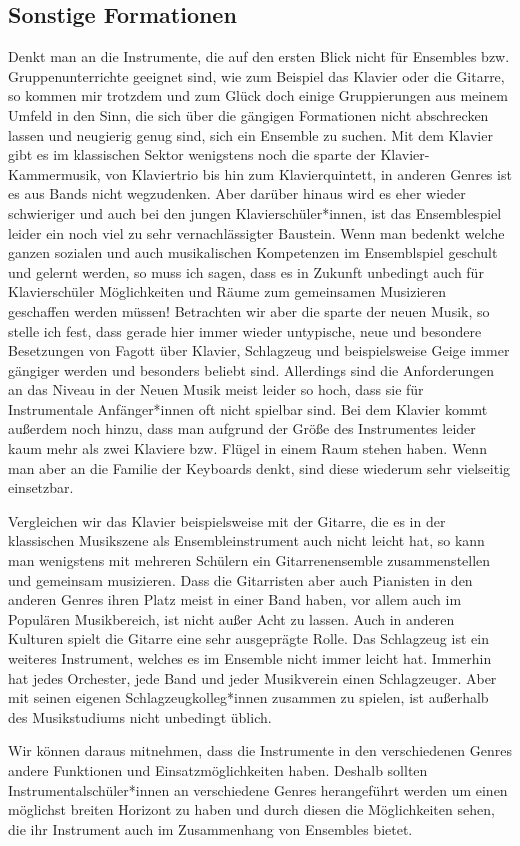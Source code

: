 \subsection{Sonstige Formationen}
Denkt man an die Instrumente, die auf den ersten Blick nicht für Ensembles bzw.
Gruppenunterrichte geeignet sind, wie zum Beispiel das Klavier oder die Gitarre,
so kommen mir trotzdem und zum Glück doch einige Gruppierungen aus meinem Umfeld
in den Sinn, die sich über die gängigen Formationen nicht abschrecken lassen und
neugierig genug sind, sich ein Ensemble zu suchen. Mit dem Klavier gibt es im
klassischen Sektor wenigstens noch die sparte der Klavier-Kammermusik, von
Klaviertrio bis hin zum Klavierquintett, in anderen Genres ist es aus Bands
nicht wegzudenken. Aber darüber hinaus wird es eher wieder schwieriger und auch
bei den jungen Klavierschüler*innen, ist das Ensemblespiel leider ein noch viel zu
sehr vernachlässigter Baustein. Wenn man bedenkt welche ganzen sozialen und auch
musikalischen Kompetenzen im Ensemblspiel geschult und gelernt werden, so muss
ich sagen, dass es in Zukunft unbedingt auch für Klavierschüler Möglichkeiten
und Räume zum gemeinsamen Musizieren geschaffen werden müssen! Betrachten wir
aber die sparte der neuen Musik, so stelle ich fest, dass gerade hier immer
wieder untypische, neue und besondere Besetzungen von Fagott über Klavier,
Schlagzeug und beispielsweise Geige immer gängiger werden und besonders beliebt
sind. Allerdings sind die Anforderungen an das Niveau in der Neuen Musik meist
leider so hoch, dass sie für Instrumentale Anfänger*innen oft nicht spielbar sind. Bei
dem Klavier kommt außerdem noch hinzu, dass man aufgrund der Größe des
Instrumentes leider kaum mehr als zwei Klaviere bzw. Flügel in einem Raum stehen
haben. Wenn man aber an die Familie der Keyboards denkt, sind diese wiederum
sehr vielseitig einsetzbar.

Vergleichen wir das Klavier beispielsweise mit der Gitarre, die es in der
klassischen Musikszene als Ensembleinstrument auch nicht leicht hat, so kann man
wenigstens mit mehreren Schülern ein Gitarrenensemble zusammenstellen und
gemeinsam musizieren. Dass die Gitarristen aber auch Pianisten in den anderen
Genres ihren Platz meist in einer Band haben, vor allem auch im Populären
Musikbereich, ist nicht außer Acht zu lassen. Auch in anderen Kulturen spielt
die Gitarre eine sehr ausgeprägte Rolle. Das Schlagzeug ist ein weiteres
Instrument, welches es im Ensemble nicht immer leicht hat. Immerhin hat jedes
Orchester, jede Band und jeder Musikverein einen Schlagzeuger. Aber mit seinen
eigenen Schlagzeugkolleg*innen zusammen zu spielen, ist außerhalb des Musikstudiums
nicht unbedingt üblich. 

Wir können daraus mitnehmen, dass die Instrumente in den verschiedenen Genres
andere Funktionen und Einsatzmöglichkeiten haben. Deshalb sollten
Instrumentalschüler*innen an verschiedene Genres herangeführt werden um einen
möglichst breiten Horizont zu haben und durch diesen die Möglichkeiten sehen,
die ihr Instrument auch im Zusammenhang von Ensembles bietet. 





